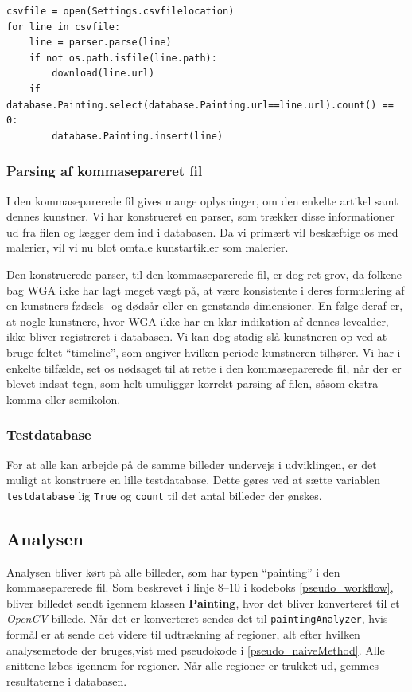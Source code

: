 {\begin{lstlisting}[caption={Pseudokode for database
    initialisering},frame=tb,label={pseudo_init_db}, captionpos=b,
    float=h]
csvfile = open(Settings.csvfilelocation)
for line in csvfile:
	line = parser.parse(line)
	if not os.path.isfile(line.path):
		download(line.url)
	if database.Painting.select(database.Painting.url==line.url).count() == 0:
		database.Painting.insert(line)
\end{lstlisting}

\subsubsection{Parsing af kommasepareret fil}
I den kommaseparerede fil gives mange oplysninger, om den enkelte
artikel samt dennes kunstner.  Vi har konstrueret en parser, som trækker
disse informationer ud fra filen og lægger dem ind i databasen. Da vi
primært vil beskæftige os med malerier, vil vi nu blot omtale
kunstartikler som malerier.

Den konstruerede parser, til den kommaseparerede fil, er dog ret grov,
da folkene bag WGA ikke har lagt meget vægt på, at være konsistente i
deres formulering af en kunstners fødsels- og dødsår eller en genstands
dimensioner. En følge deraf er, at nogle kunstnere, hvor WGA ikke har en
klar indikation af dennes levealder, ikke bliver registreret i
databasen. Vi kan dog stadig slå kunstneren op ved at bruge feltet
``timeline'', som angiver hvilken periode kunstneren tilhører. Vi har i
enkelte tilfælde, set os nødsaget til at rette i den kommaseparerede
fil, når der er blevet indsat tegn, som helt umuliggør korrekt parsing
af filen, såsom ekstra komma eller semikolon.

\subsubsection{Testdatabase}\label{test_db}
For at alle kan arbejde på de samme billeder undervejs i udviklingen, er
det muligt at konstruere en lille testdatabase.  Dette
gøres ved at sætte variablen \texttt{testdatabase} lig \texttt{True} og
\texttt{count} til det antal billeder der ønskes. 

\subsection{Analysen}
Analysen bliver kørt på alle billeder, som har typen ``painting'' i den
kommaseparerede fil. Som beskrevet i linje 8--10 i kodeboks
\ref{pseudo_workflow}, bliver billedet sendt igennem klassen
\textbf{Painting}, hvor det bliver konverteret til et
\emph{OpenCV}-billede. Når det er konverteret sendes det til
\texttt{paintingAnalyzer}, hvis formål er at sende det videre til
udtrækning af regioner, alt efter hvilken analysemetode der bruges,vist
med pseudokode i \ref{pseudo_naiveMethod}. Alle snittene løbes igennem
for regioner.
Når alle regioner er trukket ud, gemmes resultaterne i databasen.

}
